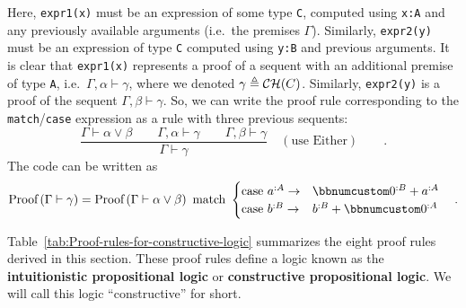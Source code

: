 \noindent Here, \lstinline!expr1(x)! must be an expression of some
type \lstinline!C!, computed using \lstinline!x:A! and any previously
available arguments (i.e.~the premises $\Gamma$). Similarly, \lstinline!expr2(y)!
must be an expression of type \lstinline!C! computed using \lstinline!y:B!
and previous arguments. It is clear that \lstinline!expr1(x)! represents
a proof of a sequent with an additional premise of type \lstinline!A!,
i.e.~$\Gamma,\alpha\vdash\gamma$, where we denoted $\gamma\triangleq{\cal CH}(C)$.
Similarly, \lstinline!expr2(y)! is a proof of the sequent $\Gamma,\beta\vdash\gamma$.
So, we can write the proof rule corresponding to the \lstinline!match!/\lstinline!case!
expression as a rule with three previous sequents:
\[
\frac{\Gamma\vdash\alpha\vee\beta\quad\quad\Gamma,\alpha\vdash\gamma\quad\quad\Gamma,\beta\vdash\gamma}{\Gamma\vdash\gamma}\quad(\text{use Either})\quad\quad.
\]
The code can be written as
\[
\text{Proof}\left(\Gamma\vdash\gamma\right)=\text{Proof}\left(\Gamma\vdash\alpha\vee\beta\right)\text{ match }\begin{cases}
\text{case }a^{:A}\rightarrow & \bbnum 0^{:B}+a^{:A}\\
\text{case }b^{:B}\rightarrow & b^{:B}+\bbnum 0^{:A}
\end{cases}\quad.
\]

Table~\ref{tab:Proof-rules-for-constructive-logic} summarizes the
eight proof rules derived in this section. These proof rules define
a logic known as the \textbf{intuitionistic
propositional logic} or \textbf{constructive
propositional logic}. We will call this logic \textsf{``}constructive\textsf{''} for
short.

